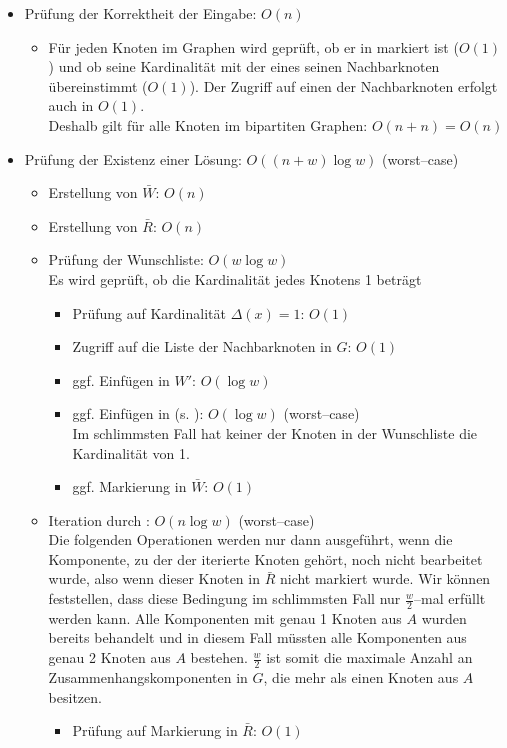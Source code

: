 \begin{itemize}
  \item Prüfung der Korrektheit der Eingabe: $O(n)$
  \begin{itemize}
    \item Für jeden Knoten im Graphen wird geprüft, ob 
    er in  markiert ist ($O(1)$) und ob seine Kardinalität mit der eines seinen
    Nachbarknoten übereinstimmt ($O(1)$). Der Zugriff auf einen der Nachbarknoten erfolgt auch in $O(1)$.\\
    Deshalb gilt für alle Knoten im bipartiten Graphen: $O(n + n) = O(n)$
  \end{itemize}

  \item Prüfung der Existenz einer Lösung: $O((n + w)\log w)$ (worst--case)
  \begin{itemize}
    \item Erstellung von $\bar{W}$: $O(n)$

    \item Erstellung von $\bar{R}$: $O(n)$

    \item Prüfung der Wunschliste: $O(w \log w)$\\
    Es wird geprüft, ob die Kardinalität jedes Knotens 1 beträgt
    \begin{itemize}
    \item Prüfung auf Kardinalität $\Delta(x) = 1$: $O(1)$
    \item Zugriff auf die Liste der Nachbarknoten in $G$: $O(1)$
    \item ggf. Einfügen in $W'$: $O(\log w)$
    \item ggf. Einfügen in  (s. ): $O(\log w)$ (worst--case)\\
    Im schlimmsten Fall hat keiner der Knoten in der Wunschliste die Kardinalität von 1.
    \item ggf. Markierung in $\bar{W}$: $O(1)$
    \end{itemize}

    \item Iteration durch : $O(n \log w)$ (worst--case)\\
    Die folgenden Operationen werden nur dann ausgeführt, wenn die Komponente,
    zu der der iterierte Knoten gehört, noch nicht bearbeitet wurde, also 
    wenn dieser Knoten in $\bar{R}$ nicht markiert wurde. Wir können feststellen, 
    dass diese Bedingung im schlimmsten Fall nur $\frac{w}{2}$--mal erfüllt werden kann.
    Alle Komponenten mit genau 1 Knoten aus $A$ wurden bereits behandelt und in diesem
    Fall müssten alle Komponenten aus genau 2 Knoten aus $A$ bestehen.
    $\frac{w}{2}$ ist somit die maximale Anzahl an Zusammenhangskomponenten in $G$,
    die mehr als einen Knoten aus $A$ besitzen.
    \begin{itemize}
    \item Prüfung auf Markierung in $\bar{R}$: $O(1)$


\end{itemize}
\end{itemize}
\end{itemize}
